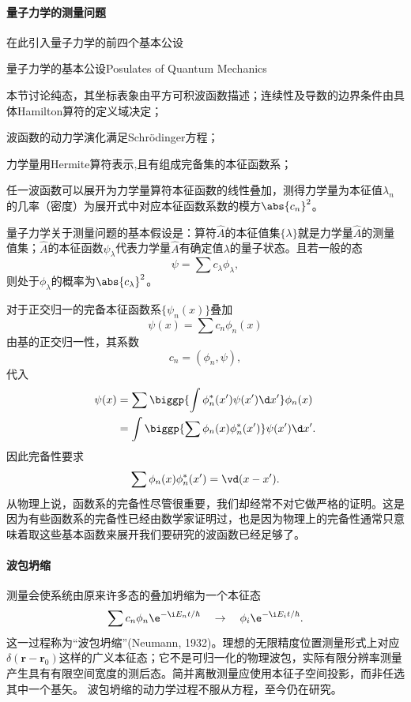 \paragraph{量子力学的测量问题}在此引入量子力学的前四个基本公设
\begin{theorem}{量子力学的基本公设}{Posulates of Quantum Mechanics}
	\begin{compactenum}
		\item 本节讨论纯态，其坐标表象由平方可积波函数描述；连续性及导数的边界条件由具体Hamilton算符的定义域决定；
		\item 波函数的动力学演化满足Schrödinger方程；
		\item 力学量用Hermite算符表示,且有组成完备集的本征函数系；
		\item 任一波函数可以展开为力学量算符本征函数的线性叠加，测得力学量为本征值$\lambda_n$的几率（密度）为展开式中对应本征函数系数的模方$\abs{c_n}^2$。
	\end{compactenum}
\end{theorem}
量子力学关于测量问题的基本假设是：算符$\hat A$的本征值集$\{\lambda\}$就是力学量$\hat A$的测量值集；$\hat A$的本征函数$\psi_\lambda$代表力学量$\hat A$有确定值$\lambda$的量子状态。且若一般的态
\[
	\psi=\sum c_\lambda\phi_\lambda,
\]
则处于$\phi_\lambda$的概率为$\abs{c_\lambda}^2$。

对于正交归一的完备本征函数系$\{\psi_n(x)\}$叠加
\[
	\psi(x)=\sum c_n\phi_n(x)
\]
由基的正交归一性，其系数
\[
c_n=(\phi_n,\psi),
\]
代入
\begin{align*}
	\psi(x) & =\sum\biggp{\int\phi_n^*(x')\psi(x')\d x'}\phi_n(x)  \\
	        & =\int\biggp{\sum\phi_n(x)\phi_n^*(x')}\psi(x')\d x'.
\end{align*}
因此完备性要求
\begin{align}
	\sum \phi_n(x)\phi_n^*(x')=\vd(x-x').
\end{align}
从物理上说，函数系的完备性尽管很重要，我们却经常不对它做严格的证明。这是因为有些函数系的完备性已经由数学家证明过，也是因为物理上的完备性通常只意味着取这些基本函数来展开我们要研究的波函数已经足够了。
\paragraph{波包坍缩}测量会使系统由原来许多态的叠加坍缩为一个本征态
\[
	\sum c_n\phi_n\e^{-\i E_nt/\hbar}\quad\rightarrow\quad\phi_i\e^{-\i E_it/\hbar}.
\]
这一过程称为“波包坍缩”(Neumann, 1932)。理想的无限精度位置测量形式上对应$\delta(\bm r-\bm r_0)$这样的广义本征态；它不是可归一化的物理波包，实际有限分辨率测量产生具有有限空间宽度的测后态。简并离散测量应使用本征子空间投影，而非任选其中一个基矢。
波包坍缩的动力学过程不服从\Schr 方程，至今仍在研究。%

